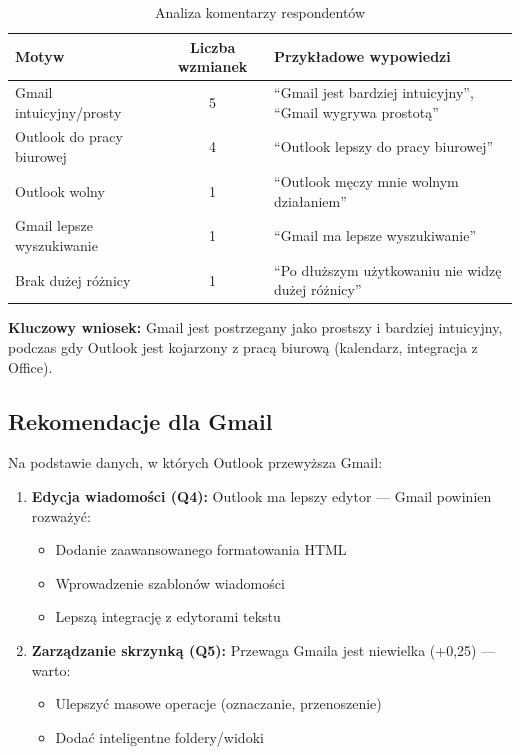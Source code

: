 \documentclass[12pt,a4paper]{article}
\begin{document}
\begin{table}[H]
\centering
\caption{Analiza komentarzy respondentów}
\label{tab:komentarze}
\begin{tabularx}{\textwidth}{|X|c|X|}
\hline
\textbf{Motyw} & \textbf{Liczba wzmianek} & \textbf{Przykładowe wypowiedzi} \\
\hline
Gmail intuicyjny/prosty & 5 & ``Gmail jest bardziej intuicyjny'', ``Gmail wygrywa prostotą'' \\
\hline
Outlook do pracy biurowej & 4 & ``Outlook lepszy do pracy biurowej'' \\
\hline
Outlook wolny & 1 & ``Outlook męczy mnie wolnym działaniem'' \\
\hline
Gmail lepsze wyszukiwanie & 1 & ``Gmail ma lepsze wyszukiwanie'' \\
\hline
Brak dużej różnicy & 1 & ``Po dłuższym użytkowaniu nie widzę dużej różnicy'' \\
\hline
\end{tabularx}
\end{table}

\textbf{Kluczowy wniosek:} Gmail jest postrzegany jako prostszy i bardziej intuicyjny, podczas gdy Outlook jest kojarzony z pracą biurową (kalendarz, integracja z Office).

\subsection{Rekomendacje dla Gmail}

Na podstawie danych, w których Outlook przewyższa Gmail:

\begin{enumerate}
    \item \textbf{Edycja wiadomości (Q4):} Outlook ma lepszy edytor --- Gmail powinien rozważyć:
    \begin{itemize}[noitemsep]
        \item Dodanie zaawansowanego formatowania HTML
        \item Wprowadzenie szablonów wiadomości
        \item Lepszą integrację z edytorami tekstu
    \end{itemize}

    \item \textbf{Zarządzanie skrzynką (Q5):} Przewaga Gmaila jest niewielka (+0,25) --- warto:
    \begin{itemize}[noitemsep]
        \item Ulepszyć masowe operacje (oznaczanie, przenoszenie)
        \item Dodać inteligentne foldery/widoki
    \end{itemize}
\end{enumerate}
\end{document}
